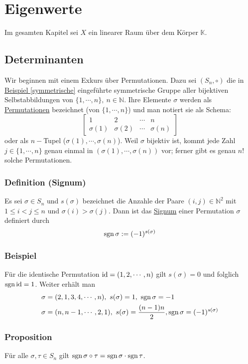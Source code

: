 \section{Eigenwerte}
Im gesamten Kapitel sei $X$ ein linearer Raum über dem Körper $\mathbb{K}$.
\subsection{Determinanten}
Wir beginnen mit einem Exkurs über Permutationen.  Dazu sei $(S_n,\circ )$ die in \hyperref[symmetrische]{Beispiel \ref*{symmetrische}} eingeführte symmetrische Gruppe aller bijektiven Selbstabbildungen von $\{1,\cdots ,n\},\ n\in\mathbb{N}$.  Ihre Elemente $\sigma$ werden als \underline{Permutationen} bezeichnet (von $\{1,\cdots ,n\}$) und man notiert sie als Schema:
\[\begin{bmatrix}1 & 2 & \cdots & n\\ \sigma (1) & \sigma (2) & \cdots & \sigma (n)\end{bmatrix}\]
oder als $n-$Tupel ($\sigma (1),\cdots ,\sigma (n)$).  Weil $\sigma$ bijektiv ist, kommt jede Zahl $j\in\{1,\cdots ,n\}$ genau einmal in $(\sigma (1),\cdots ,\sigma (n))$ vor; ferner gibt es genau $n!$ solche Permutationen.
\subsubsection{Definition (Signum)}
Es sei $\sigma \in S_n$ und $s(\sigma )$ bezeichnet die Anzahle der Paare $(i,j)\in\mathbb{N}^2$ mit $1\leq i<j\leq n$ und $\sigma (i) > \sigma (j)$.  Dann ist das \underline{Signum} einer Permutation $\sigma$ definiert durch
\[\operatorname{sgn} \sigma := (-1)^{s(\sigma )}\]
\subsubsection{Beispiel}
\label{4.1.2}
Für die identische Permutation $\operatorname{id} =(1,2,\cdots ,n)$ gilt $s(\sigma )=0$ und folglich $\operatorname{sgn} \operatorname{id} =1$.  Weiter erhält man
\begin{align*}
\sigma &=(2,1,3,4,\cdots ,n),\ s(\sigma )=1,\ \operatorname{sgn} \sigma =-1\\
\sigma &=(n,n-1,\cdots ,2, 1),\ s(\sigma )=\frac{(n-1)n}{2},\operatorname{sgn} \sigma =(-1)^{s(\sigma )}
\end{align*}
\subsubsection{Proposition}
Für alle $\sigma ,\tau \in S_n$ gilt $\operatorname{sgn} \sigma \circ \tau =\operatorname{sgn} \sigma\cdot\operatorname{sgn} \tau$.

